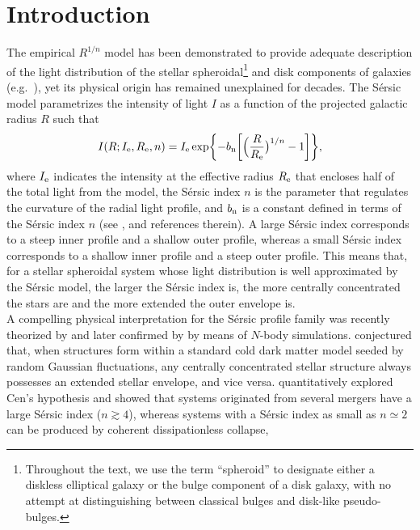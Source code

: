 \documentclass[preprint2]{emulateapj}
\begin{document}
\section{Introduction}
The empirical \cite{sersic1963,sersic1968} $R^{1/n}$ model has been demonstrated to provide adequate description 
of the light distribution of the stellar spheroidal\footnote{Throughout the text, we use the term ``spheroid'' to designate 
either a diskless elliptical galaxy or the bulge component of a disk galaxy, 
with no attempt at distinguishing between classical bulges and disk-like pseudo-bulges. } and disk components of galaxies 
(e.g.~\citealt{caon1993,andredakis1995,iodice1997,iodice1999,seigar1998,khosroshahi2000}), 
yet its physical origin has remained unexplained for decades. 
The S\'ersic model parametrizes the intensity of light $I$ as a function of the projected galactic radius $R$ such that
\begin{equation*}
I(R; I_{\rm e},R_{\rm e},n) = I_{\rm e} \exp \biggl \{ -b_{\rm n} \biggl [ \Bigl (\frac{R}{R_{\rm e}} \bigr )^{1/n} -1 \biggr ] \biggr \}, 
\end{equation*}
where $I_{\rm e}$ indicates the intensity at the effective radius $R_{\rm e}$ that encloses half of the total light from the model, 
the S\'ersic index $n$ is the parameter that regulates the curvature of the radial light profile, 
and $b_{\rm n}$ is a constant defined in terms of the S\'ersic index $n$ (see \citealt{grahamdriver2005}, and references therein). 
A large S\'ersic index corresponds to a steep inner profile and a shallow outer profile, 
whereas a small S\'ersic index corresponds to a shallow inner profile and a steep outer profile. 
This means that, for a stellar spheroidal system whose light distribution is well approximated by the S\'ersic model, 
the larger the S\'ersic index is, the more centrally concentrated the stars are and the more extended the outer envelope is. \\
A compelling physical interpretation for the S\'ersic profile family was recently theorized by \cite{cen2014} 
and later confirmed by \cite{nipoti2015} by means of $N$-body simulations. 
\cite{cen2014} conjectured that, when structures form within a standard cold dark matter model seeded by random Gaussian fluctuations, 
any centrally concentrated stellar structure always possesses an extended stellar envelope, and vice versa. 
\cite{nipoti2015} quantitatively explored Cen's hypothesis and showed that 
systems originated from several mergers have a large S\'ersic index ($n \gtrsim 4$), 
whereas systems with a S\'ersic index as small as $n \simeq 2$ can be produced by coherent dissipationless collapse, 
\end{document}
